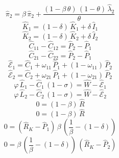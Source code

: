 \begin{dmath}
{{\hat{\pi}_{2}}}={{\beta}}\, {{\hat{\pi}_{2}}}+\frac{\left(1-{{\beta}}\, {{\theta}}\right)\, \left(1-{{\theta}}\right)\, {{\hat{\lambda}_{2}}}}{{{\theta}}}
\end{dmath}
\begin{dmath}
{{\hat{K}_{1}}}=\left(1-{{\delta}}\right)\, {{\hat{K}_{1}}}+{{\delta}}\, {{\hat{I}_{1}}}
\end{dmath}
\begin{dmath}
{{\hat{K}_{2}}}=\left(1-{{\delta}}\right)\, {{\hat{K}_{2}}}+{{\delta}}\, {{\hat{I}_{2}}}
\end{dmath}
\begin{dmath}
{{\hat{C}_{1 1}}}-{{\hat{C}_{1 2}}}={{\hat{P}_{2}}}-{{\hat{P}_{1}}}
\end{dmath}
\begin{dmath}
{{\hat{C}_{2 1}}}-{{\hat{C}_{2 2}}}={{\hat{P}_{2}}}-{{\hat{P}_{1}}}
\end{dmath}
\begin{dmath}
{{\hat{\mathscr{E}}_{1}}}={{\hat{C}_{1}}}+{{\omega_{11}}}\, {{\hat{P}_{1}}}+\left(1-{{\omega_{11}}}\right)\, {{\hat{P}_{2}}}
\end{dmath}
\begin{dmath}
{{\hat{\mathscr{E}}_{2}}}={{\hat{C}_{2}}}+{{\omega_{21}}}\, {{\hat{P}_{1}}}+\left(1-{{\omega_{21}}}\right)\, {{\hat{P}_{2}}}
\end{dmath}
\begin{dmath}
{{\varphi}}\, {{\hat{L}_{1}}}-{{\hat{C}_{1}}}\, \left(1-{{\sigma}}\right)={{\hat{W}}}-{{\hat{\mathscr{E}}_{1}}}
\end{dmath}
\begin{dmath}
{{\varphi}}\, {{\hat{L}_{2}}}-{{\hat{C}_{2}}}\, \left(1-{{\sigma}}\right)={{\hat{W}}}-{{\hat{\mathscr{E}}_{2}}}
\end{dmath}
\begin{dmath}
0=\left(1-{{\beta}}\right)\, {{\hat{R}}}
\end{dmath}
\begin{dmath}
0=\left(1-{{\beta}}\right)\, {{\hat{R}}}
\end{dmath}
\begin{dmath}
0=\left({{\hat{R}_{K}}}-{{\hat{P}_{1}}}\right)\, {{\beta}}\, \left(\frac{1}{{{\beta}}}-\left(1-{{\delta}}\right)\right)
\end{dmath}
\begin{dmath}
0={{\beta}}\, \left(\frac{1}{{{\beta}}}-\left(1-{{\delta}}\right)\right)\, \left({{\hat{R}_{K}}}-{{\hat{P}_{2}}}\right)
\end{dmath}
